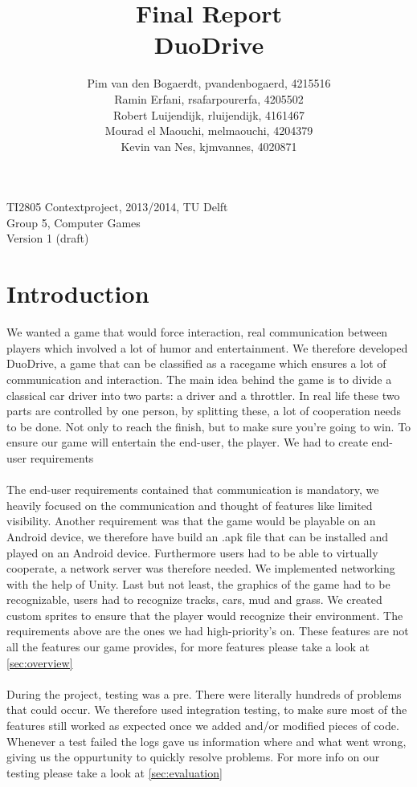 \documentclass[11pt,twoside,a4paper]{article}
\title{
  Final Report\\
  DuoDrive
}
\author{
    Pim van den Bogaerdt, pvandenbogaerd, 4215516\\
    Ramin Erfani, rsafarpourerfa, 4205502\\
    Robert Luijendijk, rluijendijk, 4161467\\
    Mourad el Maouchi, melmaouchi, 4204379\\
    Kevin van Nes, kjmvannes, 4020871
}
\begin{document}
\maketitle

\begin{center}
TI2805 Contextproject, 2013/2014, TU Delft\\
Group 5, Computer Games\\
Version 1 (draft)
\end{center}
\clearpage

\section{Introduction}
We wanted a game that would force interaction, real communication between players which involved a lot of humor and entertainment. We therefore developed DuoDrive, a game that can be classified as a racegame which ensures a lot of communication and interaction. The main idea behind the game is to divide a classical car driver into two parts: a driver and a throttler. In real life these two parts are controlled by one person, by splitting these, a lot of cooperation needs to be done. Not only to reach the finish, but to make sure you're going to win. To ensure our game will entertain the end-user, the player. We had to create end-user requirements\\\\
The end-user requirements contained that communication is mandatory, we heavily focused on the communication and thought of features like limited visibility. Another requirement was that the game would be playable on an Android device, we therefore have build an .apk file that can be installed and played on an Android device. Furthermore users had to be able to virtually cooperate, a network server was therefore needed. We implemented networking with the help of Unity. Last but not least, the graphics of the game had to be recognizable, users had to recognize tracks, cars, mud and grass. We created custom sprites to ensure that the player would recognize their environment. The requirements above are the ones we had high-priority's on. These features are not all the features our game provides, for more features please take a look at \ref{sec:overview}\\\\
During the project, testing was a pre. There were literally hundreds of problems that could occur. We therefore used integration testing, to make sure most of the features still worked as expected once we added and/or modified pieces of code. Whenever a test failed the logs gave us information where and what went wrong, giving us the oppurtunity to quickly resolve problems. For more info on our testing please take a look at \ref{sec:evaluation}\\\\
\end{document}

